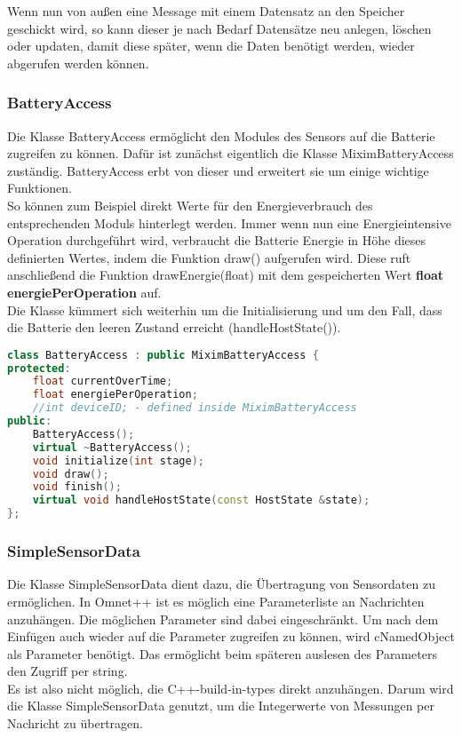 Wenn nun von außen eine Message mit einem Datensatz an den Speicher geschickt wird, so kann dieser je nach Bedarf Datensätze neu anlegen, löschen oder updaten, damit diese später, wenn die Daten benötigt werden, wieder abgerufen werden können.

\subsubsection{BatteryAccess}

Die Klasse BatteryAccess ermöglicht den Modules des Sensors auf die Batterie zugreifen zu können. Dafür ist zunächst eigentlich die Klasse MiximBatteryAccess zuständig. BatteryAccess erbt von dieser und erweitert sie um einige wichtige Funktionen.\\
So können zum Beispiel direkt Werte für den Energieverbrauch des entsprechenden Moduls hinterlegt werden. Immer wenn nun eine Energieintensive Operation durchgeführt wird, verbraucht die Batterie Energie in Höhe dieses definierten Wertes, indem die Funktion draw() aufgerufen wird. Diese ruft anschließend die Funktion drawEnergie(float) mit dem gespeicherten Wert \textbf{float energiePerOperation} auf.\\
Die Klasse kümmert sich weiterhin um die Initialisierung und um den Fall, dass die Batterie den leeren Zustand erreicht (handleHostState()).

\begin{lstlisting}[language=C++, label=lst:BatteryAccess, caption=BatteryAccess]
class BatteryAccess : public MiximBatteryAccess {
protected:
    float currentOverTime;
    float energiePerOperation;
    //int deviceID; - defined inside MiximBatteryAccess
public:
    BatteryAccess();
    virtual ~BatteryAccess();
    void initialize(int stage);
    void draw();
    void finish();
    virtual void handleHostState(const HostState &state);
};
\end{lstlisting}

\subsubsection{SimpleSensorData}

Die Klasse SimpleSensorData dient dazu, die Übertragung von Sensordaten zu ermöglichen. In Omnet++ ist es möglich eine Parameterliste an Nachrichten anzuhängen. Die möglichen Parameter sind dabei eingeschränkt. Um nach dem Einfügen auch wieder auf die Parameter zugreifen zu können, wird cNamedObject als Parameter benötigt. Das ermöglicht beim späteren auslesen des Parameters den Zugriff per string.\\
Es ist also nicht möglich, die C++-build-in-types direkt anzuhängen. Darum wird die Klasse SimpleSensorData genutzt, um die Integerwerte von Messungen per Nachricht zu übertragen.

